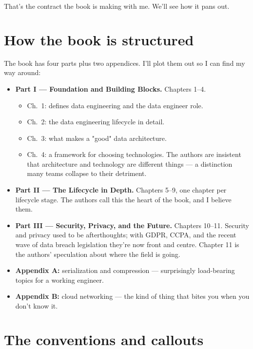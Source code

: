 That's the contract the book is making with me. We'll see how it pans out.

\section*{How the book is structured}

The book has four parts plus two appendices. I'll plot them out so I can find my way around:

\begin{itemize}[leftmargin=*]
  \item \textbf{Part I — Foundation and Building Blocks.} Chapters 1--4.
  \begin{itemize}
    \item Ch.~1: defines data engineering and the data engineer role.
    \item Ch.~2: the data engineering lifecycle in detail.
    \item Ch.~3: what makes a "good" data architecture.
    \item Ch.~4: a framework for choosing technologies. The authors are insistent that architecture and technology are different things — a distinction many teams collapse to their detriment.
  \end{itemize}
  \item \textbf{Part II — The Lifecycle in Depth.} Chapters 5--9, one chapter per lifecycle stage. The authors call this the heart of the book, and I believe them.
  \item \textbf{Part III — Security, Privacy, and the Future.} Chapters 10--11. Security and privacy used to be afterthoughts; with GDPR, CCPA, and the recent wave of data breach legislation they're now front and centre. Chapter 11 is the authors' speculation about where the field is going.
  \item \textbf{Appendix A:} serialization and compression — surprisingly load-bearing topics for a working engineer.
  \item \textbf{Appendix B:} cloud networking — the kind of thing that bites you when you don't know it.
\end{itemize}

\section*{The conventions and callouts}

